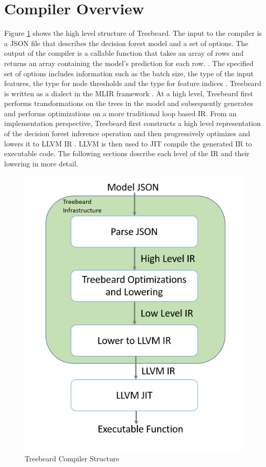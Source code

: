 \section{Compiler Overview}
Figure \ref{Fig:CompilerStructure} shows the high level structure of Treebeard. The input to the compiler is a JSON file that describes the decision forest model and a set of options. The output of the compiler is a callable function that takes an array of rows and returns an array containing the model's prediction for each row. . The specified set of options includes information such as the batch size, the type of the input features, the type for node thresholds and the type for feature indices . Treebeard is written as a dialect in the MLIR framework \cite{MLIR}. At a high level, Treebeard first performs transformations on the trees in the model and subsequently generates and performs optimizations on a more traditional loop based IR. From an implementation perspective, Treebeard first constructs a high level representation of the decision forest inference operation and then progressively optimizes and lowers it to LLVM IR \cite{LLVM}. LLVM is then used to JIT compile the generated IR to executable code. The following sections describe each level of the IR and their lowering in more detail.

\begin{figure}
  \centering
  \includegraphics[scale = 0.3]{figures/CompilerStructure.PNG}
  \caption{Treebeard Compiler Structure}
  \label{Fig:CompilerStructure}
\end{figure}

